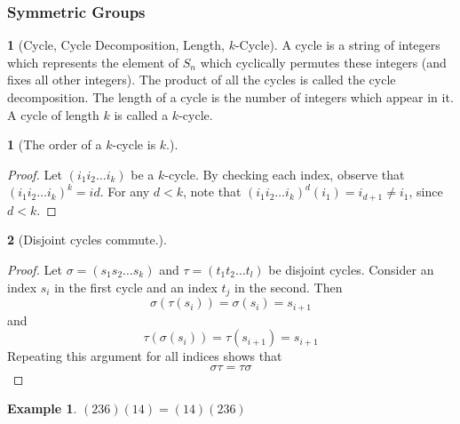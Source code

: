 \documentclass[12pt]{article}
\theoremstyle{definition}
\newtheorem{definition}{\color{NavyBlue}{\textbf{Definition}}}
\newtheorem{theorem}{\color{ForestGreen}{\textbf{Theorem}}}
\newtheorem{example}{\color{WildStrawberry}Example}
\theoremstyle{definition}
\begin{document}
\subsubsection{Symmetric Groups}
\begin{definition}[Cycle, Cycle Decomposition, Length, $k$-Cycle]
A cycle is a string of integers which represents the element of $S_n$ which cyclically permutes these integers (and fixes all other integers). The product of all the cycles is called the cycle decomposition. The length of a cycle is the number of integers which appear in it. A cycle of length $k$ is called a $k$-cycle. 
\end{definition}

\begin{theorem}[The order of a $k$-cycle is $k$.]
\end{theorem}
\begin{proof}
Let $(i_1 i_2 \ldots i_k)$ be a $k$-cycle. By checking each index, observe that $(i_1 i_2 \ldots i_k)^k = id$. For any $d < k$, note that $(i_1 i_2 \ldots i_k)^d (i_1) = i_{d+1} \neq i_1$, since $d < k$. 
\end{proof}

\begin{theorem}[Disjoint cycles commute.]
\end{theorem}
\begin{proof}
Let $\sigma = (s_1 s_2 \ldots s_k)$ and $\tau = (t_1 t_2 \ldots t_l)$ be disjoint cycles. Consider an index $s_i$ in the first cycle and an index $t_j$ in the second. Then
\begin{equation}
\sigma(\tau(s_i)) = \sigma(s_i) = s_{i+1}
\end{equation}
and
\begin{equation}
\tau(\sigma(s_i)) = \tau(s_{i+1}) = s_{i+1}
\end{equation}
Repeating this argument for all indices shows that
\begin{equation}
\sigma \tau = \tau \sigma
\end{equation}
\end{proof}

\begin{example}
$(2 3 6) (1 4) = (1 4) (2 3 6)$
\end{example}
\end{document}

